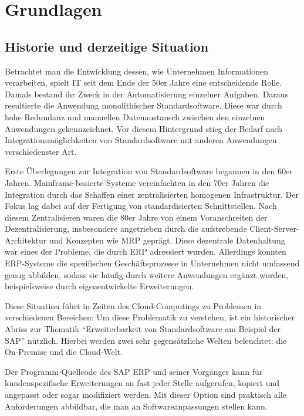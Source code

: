 \chapter{Grundlagen}
% 
% 
% 
% 
% 
% 
\section{Historie und derzeitige Situation}
Betrachtet man die Entwicklung dessen, wie Unternehmen Informationen verarbeiten, spielt \ac{IT} seit dem Ende der 50er Jahre eine entscheidende Rolle. Damals bestand ihr Zweck in der Automatisierung einzelner Aufgaben. Daraus resultierte die Anwendung monolithischer Standardsoftware. Diese war durch hohe Redundanz und manuellen Datenaustausch zwischen den einzelnen Anwendungen gekennzeichnet. Vor diesem Hintergrund stieg der Bedarf nach Integrationsmöglichkeiten von Standardsoftware mit anderen Anwendungen verschiedenster Art.  

Erste Überlegungen zur Integration von Standardsoftware begannen in den 60er Jahren. Mainframe-basierte Systeme vereinfachten in den 70er Jahren die Integration durch das Schaffen einer zentralisierten homogenen Infrastruktur. Der Fokus lag dabei auf der Fertigung von standardisierten Schnittstellen. Nach diesem Zentralisieren waren die 80er Jahre von einem Voranschreiten der Dezentralisierung, insbesondere angetrieben durch die aufstrebende Client-Server-Architektur und Konzepten wie \ac{MRP} geprägt. Diese dezentrale Datenhaltung war eines der Probleme, die durch \ac{ERP} adressiert wurden. Allerdings konnten \ac{ERP}-Systeme die spezifischen Geschäftsprozesse in Unternehmen nicht umfassend genug abbilden, sodass sie häufig durch weitere Anwendungen ergänzt wurden, beispielsweise durch eigenentwickelte Erweiterungen. 
\autocite{Kaib.2002}

Diese Situation führt in Zeiten des Cloud-Computings zu Problemen in verschiedenen Bereichen: 
Um diese Problematik zu verstehen, ist ein historischer Abriss zur Thematik \enquote{Erweiterbarkeit von Standardsoftware am Beispiel der SAP} nützlich. Hierbei werden zwei sehr gegensätzliche Welten beleuchtet: die On-Premise und die Cloud-Welt.

Der Programm-Quellcode des SAP \ac{ERP} und seiner Vorgänger kann für kundenspezifische Erweiterungen an fast jeder Stelle aufgerufen, kopiert und angepasst oder sogar modifiziert werden. Mit dieser Option sind praktisch alle Anforderungen abbildbar, die man an Softwareanpassungen stellen kann.

